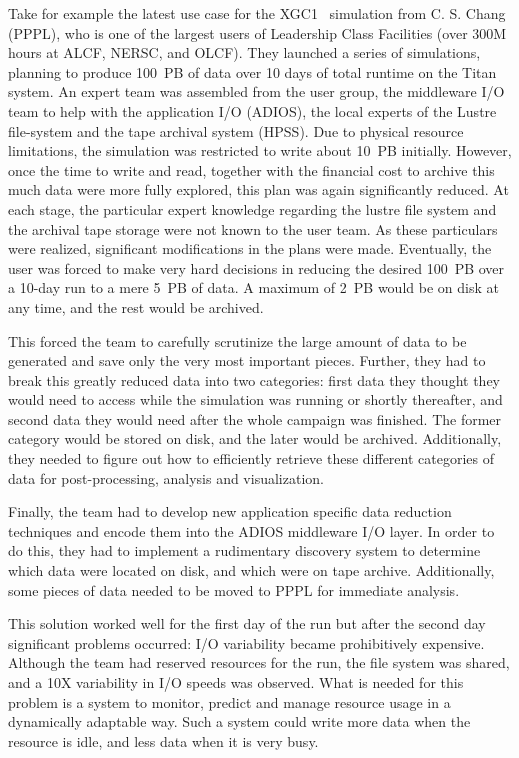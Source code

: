 Take for example the latest use case for the XGC1~\cite{chang2006integrated} simulation from C. S. Chang (PPPL), who is one of the largest users of Leadership Class Facilities (over 300M hours at ALCF, NERSC, and OLCF). They launched a series of simulations, planning to produce 100~PB of data over 10 days of total runtime on the Titan system. An expert team was assembled from the user group, the middleware I/O team to help with the application I/O (ADIOS), the local experts of the Lustre file-system and the tape archival system (HPSS). Due to physical resource limitations, the simulation was restricted to write about 10~PB initially. However, once the time to write and read, together with the financial cost to archive this much data were more fully explored, this plan was again significantly reduced. At each stage, the particular expert knowledge regarding the lustre file system and the archival tape storage were not known to the user team. As these particulars were realized, significant modifications in the plans were made. Eventually, the user was forced to make very hard decisions in reducing the desired 100~PB over a 10-day run to a mere 5~PB of data. A maximum of 2~PB would be on disk at any time, and the rest would be archived.

This forced the team to carefully scrutinize the large amount of data to be generated and save only the very most important pieces. Further, they had to break this greatly reduced data into two categories: first data they thought they would need to access while the simulation was running or shortly thereafter, and second data they would need after the whole campaign was finished. The former category would be stored on disk, and the later would be archived. Additionally, they needed to figure out how to efficiently retrieve these different categories of data for post-processing, analysis and visualization.

Finally, the team had to develop new application specific data reduction techniques and encode them into the ADIOS middleware I/O layer. In order to do this, they had to implement a rudimentary discovery system to determine which data were located on disk, and which were on tape archive.  Additionally, some pieces of data needed to be moved to PPPL for immediate analysis.

This solution worked well for the first day of the run but after the second day significant problems occurred: I/O variability became prohibitively expensive. Although the team had reserved resources for the run, the file system was shared, and a 10X variability in I/O speeds was observed. What is needed for this problem is a system to monitor, predict and manage resource usage in a dynamically adaptable way. Such a system could write more data when the resource is idle, and less data when it is very busy.

